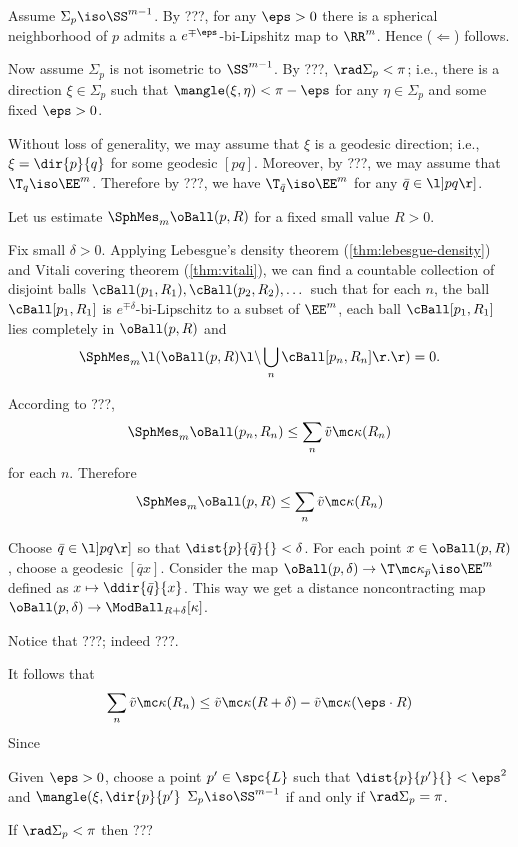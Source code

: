 Assume $\Sigma_p\iso\SS^{m-1}$.
By ???, for any $\eps>0$ there is a spherical neighborhood
of $p$ admits a $e^{\mp\eps}$-bi-Lipshitz map to $\RR^m$.
Hence ($\Leftarrow$) follows.

Now assume $\Sigma_p$ is not isometric to $\SS^{m-1}$.
By ???, $\rad\Sigma_p<\pi$;
i.e., there is a direction $\xi\in \Sigma_p$ such that 
$\mangle(\xi,\eta)<\pi-\eps$ for any $\eta\in\Sigma_p$ and some fixed $\eps>0$.

Without loss of generality, we may assume that $\xi$ is a geodesic direction;
i.e., $\xi=\dir{p}{q}$ for some geodesic $[pq]$.
Moreover, by ???, we may assume that $\T_q\iso\EE^m$.
Therefore by ???, we have $\T_{\bar q}\iso\EE^m$ for any $\bar q\in\l]pq\r]$.

Let us estimate 
$\SphMes_m\oBall(p,R)$ 
for a fixed small value $R>0$.

Fix small $\delta>0$.
Applying Lebesgue's density theorem (\ref{thm:lebesgue-density})
and Vitali covering theorem (\ref{thm:vitali}),
we can find a countable collection of disjoint balls $\cBall(p_1,R_1),\cBall(p_2,R_2),\dots$ such that for each $n$, 
the ball $\cBall[p_1,R_1]$ is $e^{\mp\delta}$-bi-Lipschitz to a subset of $\EE^m$, each ball $\cBall[p_1,R_1]$ lies completely in $\oBall(p,R)$ and 
\[\SphMes_m\l(\oBall(p,R)\l\backslash \bigcup_n\cBall[p_n,R_n]\r.\r)=0.\]

According to ???,
\[\SphMes_m\oBall(p_n,R_n)\le \sum_n \tilde v\mc\kappa(R_n)\]
for each $n$.
Therefore
\[\SphMes_m\oBall(p,R)\le \sum_n \tilde v\mc\kappa(R_n)\]

Choose $\bar q\in \l]pq\r]$ so that $\dist{p}{\bar q}{}<\delta$.
For each point $x\in \oBall(p,R)$, 
choose a geodesic $[\bar q x]$.
Consider the map $\oBall(p,\delta)\to \T\mc\kappa_{\bar p}\iso \EE^m$
defined as $x\mapsto \ddir{\bar q}{x}$.
This way we get a distance noncontracting map $\oBall(p,\delta)\to \ModBall_{R+\delta}[\kappa]$.

Notice that ???; indeed ???.

It follows that 
\[\sum_n \tilde v\mc\kappa(R_n)\le \tilde v\mc\kappa(R+\delta)-\tilde v\mc\kappa(\eps\cdot R)\]
Since 


Given $\eps>0$, choose a point $p'\in\spc{L}$ such that 
$\dist{p}{p'}{}<\eps^2$ and $\mangle(\xi,\dir{p}{p'}$
$\Sigma_p\iso\SS^{m-1}$
if and only if $\rad\Sigma_p=\pi$.

If $\rad\Sigma_p<\pi$ then ???
\qeds







